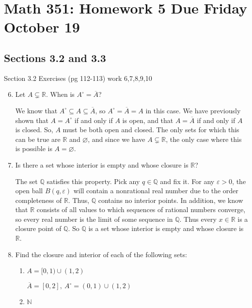 \documentclass[11pt]{article}
\newcommand{\N}{\mathbb{N}}
\newcommand{\Q}{\mathbb{Q}}
\newcommand{\R}{\mathbb{R}}
\begin{document}
\setlength{\parindent}{0pt}
\setlength{\parskip}{9pt}


\section*{Math 351: Homework 5  Due Friday October 19 }

\bigskip

\subsection*{Sections 3.2 and 3.3}

Section 3.2 Exercises (pg 112-113) work 6,7,8,9,10

\begin{enumerate}
\setcounter{enumi}{5}

\item Let $A\subsetneq\R$. When is $A^\circ = \overline{A}$?

We know that $A^\circ\subseteq A\subseteq \overline{A}$, so 
$A^\circ = \overline{A} = A$ in this case. We have previously shown that
$A=A^\circ$ if and only if $A$ is open, and that 
$A=\overline{A}$ if and only if $A$ is closed. So, $A$
must be both open and closed. The only sets for which this can be true are
$\R$ and $\varnothing$, and since we have $A\subsetneq \R$, the only case
where this is possible is $A=\varnothing$.

\item Is there a set whose interior is empty and whose closure is $\R$?

The set $\Q$ satisfies this property. Pick any $q\in\Q$ and fix it. For
any $\varepsilon>0$, the open ball $B(q,\varepsilon)$ will contain a
nonrational real number due to the order completeness of $\R$. Thus,
$\Q$ contains no interior points. In addition, we know that $\R$ consists
of all values to which sequences of rational numbers converge, so every
real number is the limit of some sequence in $\Q$. Thus every $x\in\R$
is a closure point of $\Q$. So $\Q$ is a set whose interior is empty and
whose closure is $\R$.  

\item Find the closure and interior of each of the following sets:

\begin{enumerate}
\item{$A=[0,1)\cup(1,2)$}

$\overline{A}=[0,2],\ A^\circ=(0,1)\cup(1,2)$
\item{$\N$}


\end{enumerate}
\end{enumerate}
\end{document}
